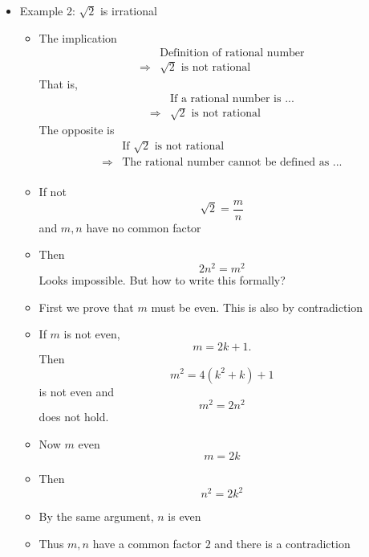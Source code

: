 \begin{frame}[allowframebreaks]
\begin{itemize}
\item Example 2: $\sqrt{2}$ is irrational
  \begin{itemize}
  \item The implication
    \begin{equation*}
      \begin{split}
&   \text{Definition of rational number}\\
\Rightarrow&  \sqrt{2} \text{ is not rational}
\end{split}
\end{equation*}
That is,
    \begin{equation*}
      \begin{split}
&   \text{If a rational number is ...}\\
\Rightarrow&  \sqrt{2} \text{ is not rational}
\end{split}
\end{equation*}
The opposite is
    \begin{equation*}
      \begin{split}
        &  \text{If  $\sqrt{2}$ is not rational}
\\
\Rightarrow& \text{The rational number cannot be defined as ...}\\
\end{split}
\end{equation*}
  \item If not
    \begin{equation*}
      \sqrt{2}=\frac{m}{n}
    \end{equation*}
    and
    $m,n$ have no common factor
  \item Then
    \begin{equation*}
      2n^2=m^2
    \end{equation*}
Looks impossible. But how to write this formally?
\item First we prove that $m$ must be even. This is also by
  contradiction
\item [] If $m$ is not even, 
  \begin{equation*}
    m = 2k + 1.
  \end{equation*}
Then
\begin{equation*}
  m^2 = 4(k^2 + k) + 1
\end{equation*}
is not even and
\begin{equation*}
  m^2 = 2n^2
\end{equation*}
does not hold.
\item Now $m$ even
  $$m=2k$$
\item [] Then
  \begin{equation*}
    n^2 = 2k^2
  \end{equation*}
\item By the same argument, $n$ is even
\item Thus $m, n$ have a common factor $2$ and there
is a contradiction
  \end{itemize}

\end{itemize}\end{frame}



